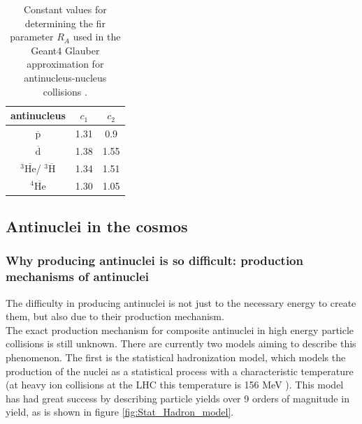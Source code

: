 \begin{table}[]
    \centering
    \begin{tabular}{|c|c|c|}
        \hline
        antinucleus & $c_1$ & $c_2$ \\
        \hline 
        $\overline{\mathrm{p}}$& 1.31& 0.9\\
        \hline
        $\overline{\mathrm{d}}$& 1.38& 1.55\\
        \hline
        $^3\overline{\mathrm{He}}$/ $^3\overline{\mathrm{H}}$& 1.34& 1.51\\
        \hline
        $^4\overline{\mathrm{He}}$& 1.30& 1.05\\
        \hline
    \end{tabular}
    \caption{Constant values for determining the fir parameter $R_A$ used in the Geant4 Glauber approximation for antinucleus-nucleus collisions \cite{Antinucleus-nucleus_Geant4}.}
    \label{tab:antinucleus_nucleus_constants_Glauber}
\end{table}






%
%
\subsection{Antinuclei in the cosmos}

\subsubsection{ Why producing antinuclei is so difficult: production mechanisms of antinuclei}\label{sec:IntroProductionAntinuclei}
The difficulty in producing antinuclei is not just to the necessary energy to create them, but also due to their production mechanism. \\

The exact production mechanism for composite antinuclei in high energy particle collisions is still unknown. There are currently two models aiming to describe this phenomenon. The first is the statistical hadronization model, which models the production of the nuclei as a statistical process with a characteristic temperature (at heavy ion collisions at the LHC this temperature is 156 MeV \cite{4He_PbPb}). This model has had great success by describing particle yields over 9 orders of magnitude in yield, as is shown in figure \ref{fig:Stat_Hadron_model}.

